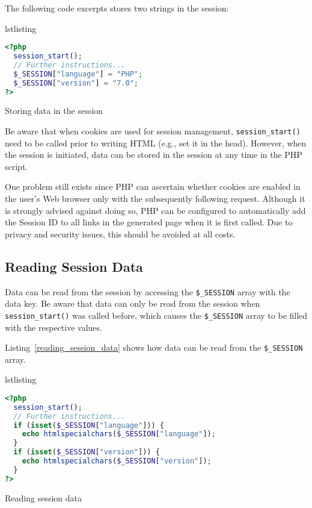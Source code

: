 \documentclass[a4paper, justified, notoc]{tufte-handout} %
\makeatletter
\newenvironment{listing}[1][htbp]
  {\ifvmode\else\unskip\fi\begin{@tufte@float}[#1]{lstlisting}{}}
  {\end{@tufte@float} } %
\makeatother
\begin{document}
The following code excerpts stores two strings in the session:
\begin{listing}
\begin{lstlisting}[language=PHP]
<?php
  session_start();
  // Further instructions...
  $_SESSION["language"] = "PHP";
  $_SESSION["version"] = "7.0";
?>
\end{lstlisting}
	\caption{Storing data in the session}
	\label{writing_session_data}
\end{listing}

Be aware that when cookies are used for session management, \texttt{session\_start()} need to be called prior to writing HTML (e.g., set it in the head). However, when the session is initiated, data can be stored in the session at any time in the PHP script.

One problem still exists since PHP can ascertain whether cookies are enabled in the user's Web browser only with the subsequently following request. Although it is strongly advised against doing so, PHP can be configured to automatically add the Session ID to all links in the generated page when it is first called. Due to privacy and security issues, this should be avoided at all costs.


\subsection{Reading Session Data} %
\label{sub:reading_session_data}
Data can be read from the session by accessing the \texttt{\$\_SESSION} array with the data key.
Be aware that data can only be read from the session when \texttt{session\_start()} was called before, which causes the \texttt{\$\_SESSION} array to be filled with the respective values. 

Listing~\ref{reading_session_data} shows how data can be read from the \texttt{\$\_SESSION} array. 
\begin{listing}
\begin{lstlisting}[language=PHP]
<?php
  session_start();
  // Further instructions...
  if (isset($_SESSION["language"])) {
    echo htmlspecialchars($_SESSION["language"]);
  }
  if (isset($_SESSION["version"])) {
    echo htmlspecialchars($_SESSION["version"]);
  }
?>
\end{lstlisting}
	\caption{Reading session data}
	\label{reading_session_data}
\end{listing}
\end{document}
